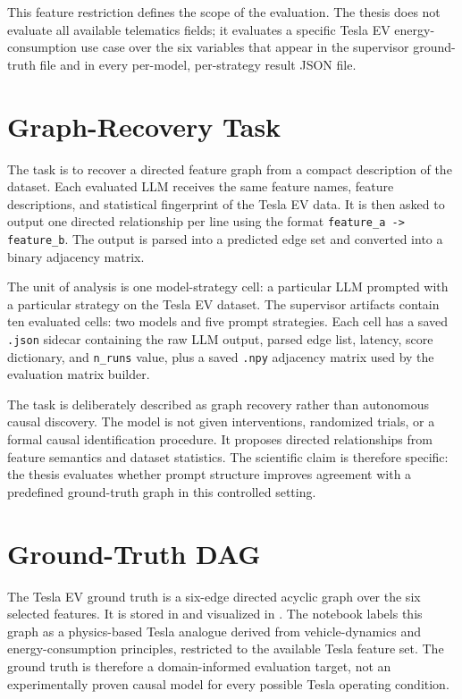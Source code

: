 This feature restriction defines the scope of the evaluation. The thesis
does not evaluate all available telematics fields; it evaluates a specific
Tesla EV energy-consumption use case over the six variables that appear in the
supervisor ground-truth file
 and in every
per-model, per-strategy result JSON file.

\section{Graph-Recovery Task}

The task is to recover a directed feature graph from a compact description of
the dataset. Each evaluated LLM receives the same feature names, feature
descriptions, and statistical fingerprint of the Tesla EV data. It is then
asked to output one directed relationship per line using the format
\texttt{feature\_a -> feature\_b}. The output is parsed into a predicted edge
set and converted into a binary adjacency matrix.

The unit of analysis is one model-strategy cell: a particular LLM prompted
with a particular strategy on the Tesla EV dataset. The supervisor artifacts
contain ten evaluated cells: two models and five prompt strategies. Each cell
has a saved \texttt{.json} sidecar containing the raw LLM output, parsed edge
list, latency, score dictionary, and \texttt{n\_runs} value, plus a saved
\texttt{.npy} adjacency matrix used by the evaluation matrix builder.

The task is deliberately described as graph recovery rather than autonomous
causal discovery. The model is not given interventions, randomized trials, or
a formal causal identification procedure. It proposes directed relationships
from feature semantics and dataset statistics. The scientific claim is
therefore specific: the thesis evaluates whether prompt structure improves
agreement with a predefined ground-truth graph in this controlled setting.

\section{Ground-Truth DAG}
\label{sec:ground-truth-dag}

The Tesla EV ground truth is a six-edge directed acyclic graph over the six
selected features. It is stored in
 and visualized in
. The notebook labels this
graph as a physics-based Tesla analogue derived from vehicle-dynamics and
energy-consumption principles, restricted to the available Tesla feature set.
The ground truth is therefore a domain-informed evaluation target, not an
experimentally proven causal model for every possible Tesla operating
condition.

